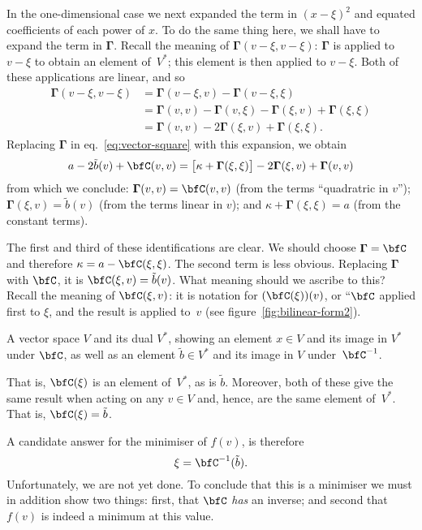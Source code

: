 \documentclass[10pt, a4paper]{article}
\begin{document}
In the one-dimensional case we next expanded the term in ${(x-\xi)}^2$
and equated coefficients of each power of $x$. To do the same thing
here, we shall have to expand the term in $\bm{\Gamma}$. Recall the meaning of
$\bm{\Gamma}(v-\xi, v-\xi)$: $\bm{\Gamma}$ is applied to $v-\xi$ to obtain an element
of~$V^*$; this element is then applied to $v-\xi$. Both of these
applications are linear, and so
\[
  \begin{aligned}
  \bm{\Gamma}(v-\xi,v-\xi) & = \bm{\Gamma}(v-\xi,v)-\bm{\Gamma}(v-\xi, \xi) \\
  & = \bm{\Gamma}(v,v)-\bm{\Gamma}(v, \xi) - \bm{\Gamma}(\xi,v) + \bm{\Gamma}(\xi, \xi) \\
  & = \bm{\Gamma}(v,v)-2\bm{\Gamma}(\xi,v)+\bm{\Gamma}(\xi,\xi).
  \end{aligned}
\]
Replacing $\bm{\Gamma}$ in eq.~\eqref{eq:vector-square} with this expansion, we
obtain
\[
  a -2\tilde{b}(v)+\bfC(v,v) = \bigl[\kappa+\bm{\Gamma}(\xi,\xi)\bigr] -2\bm{\Gamma}(\xi,v) + \bm{\Gamma}(v,v)
\]
from which we conclude: $\bm{\Gamma}(v,v) = \bfC(v,v)$ (from the
terms “quadratric in $v$”); $\bm{\Gamma}(\xi, v) = \tilde{b}(v)$ (from the terms
linear in $v$); and $\kappa+\bm{\Gamma}(\xi,\xi)=a$ (from the constant terms).

The first and third of these identifications are clear. We should
choose $\bm{\Gamma}=\bfC$ and therefore $\kappa=a-\bfC(\xi,\xi)$. The second term is less
obvious. Replacing $\bm{\Gamma}$ with $\bfC$, it is
$\bfC(\xi, v) = \tilde{b}(v)$. What meaning should we ascribe to this?
Recall the meaning of $\bfC(\xi,v)$: it is notation for $(\bfC(\xi))(v)$, or
“$\bfC$ applied first to $\xi$, and the result is applied to~$v$ (see
figure~\ref{fig:bilinear-form2}).
\begin{marginfigure}
  \begin{center}
  \end{center}
\caption{A vector space $V$ and its dual $V^*$, showing an element $x\in
  V$ and its image in $V^*$ under $\bfC$, as well as an element
  $\tilde{b}\in V^*$ and its image in $V$ under~$\bfC^{-1}$.\label{fig:bilinear-form2}}
\end{marginfigure}
That is, $\bfC(\xi)$ is an element of~$V^*$, as is $\tilde{b}$. Moreover,
both of these give the same result when acting on any $v\in V$ and,
hence, are the same element of~$V^*$. That is, $\bfC(\xi) = \tilde{b}$. 

A candidate answer for the minimiser of $f(v)$, is therefore
\begin{equation}
  \label{eq:minimiser}
  \xi = \bfC^{-1}(\tilde{b}).
\end{equation}
Unfortunately, we are not yet done. To conclude that this is a
minimiser we must in addition show two things: first, that $\bfC$
\emph{has} an inverse; and second that $f(v)$ is indeed a minimum at
this value.
\end{document}
